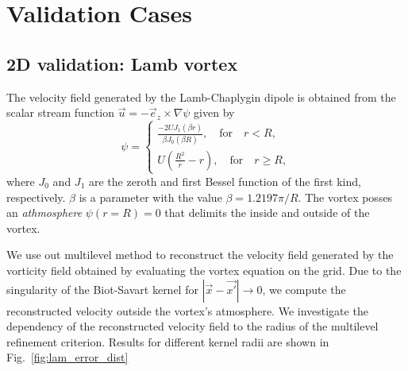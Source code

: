 \documentclass{article}
\begin{document}
\paragraph{}

\section{Validation Cases}

\subsection{2D validation: Lamb vortex}

The velocity field generated by the Lamb-Chaplygin dipole is obtained from the scalar stream function $\vec{u} = -\vec{e}_z\times \nabla \psi$ given by
\begin{equation}
    \psi = \begin{cases}
    \frac{-2UJ_1(\beta r)}{\beta J_0(\beta R)}, \quad \text{for} \quad r < R,\\
    U\left(\frac{R^2}{r}-r\right), \quad \text{for} \quad r \ge R,    \end{cases}
\end{equation}
where $J_0$ and $J_1$ are the zeroth and first Bessel function of the first kind, respectively. $\beta$ is a parameter with the value $\beta=1.2197\pi/R$. The vortex posses an \emph{athmosphere} $\psi(r=R)=0$ that delimits the inside and outside of the vortex.

We use out multilevel method to reconstruct the velocity field generated by the vorticity field obtained by evaluating the vortex equation on the grid. Due to the singularity of the Biot-Savart kernel for $|\vec{x}-\vec{x'}|\to0$, we compute the reconstructed velocity outside the vortex's atmosphere. We investigate the dependency of the reconstructed velocity field to the radius of the multilevel refinement criterion. Results for different kernel radii are shown in Fig.~\ref{fig:lam_error_dist}
\end{document}

